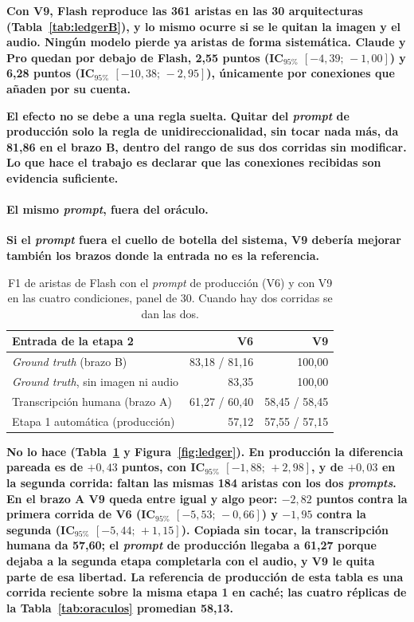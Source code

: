 \documentclass[a4paper, twocolumn, 10pt]{IEEEtran}
\newcommand{\nuevo}[1]{{\bfseries #1}}
\begin{document}
\nuevo{Con V9, Flash reproduce las 361 aristas en las 30 arquitecturas
(Tabla~\ref{tab:ledgerB}), y lo mismo ocurre si se le quitan la imagen y el audio.
Ningún modelo pierde ya aristas de forma sistemática. Claude y Pro quedan por debajo
de Flash, 2,55 puntos (IC$_{95\%}$ $[-4{,}39;\,-1{,}00]$) y 6,28 puntos (IC$_{95\%}$
$[-10{,}38;\,-2{,}95]$), únicamente por conexiones que añaden por su cuenta.}

\nuevo{El efecto no se debe a una regla suelta. Quitar del \emph{prompt} de
producción solo la regla de unidireccionalidad, sin tocar nada más, da 81,86 en el
brazo B, dentro del rango de sus dos corridas sin modificar. Lo que hace el trabajo
es declarar que las conexiones recibidas son evidencia suficiente.}

\paragraph{\nuevo{El mismo \emph{prompt}, fuera del oráculo.}} \nuevo{Si el \emph{prompt}
fuera el cuello de botella del sistema, V9 debería mejorar también los brazos donde
la entrada no es la referencia.}

\begin{table}[H]
\centering\footnotesize\setlength{\tabcolsep}{3pt}\bfseries
\caption{F1 de aristas de Flash con el \emph{prompt} de producción (V6) y con V9 en
las cuatro condiciones, panel de 30. Cuando hay dos corridas se dan las dos.}
\label{tab:ledger4}
\begin{tabular}{lrr}
\toprule
Entrada de la etapa 2 & V6 & V9\\
\midrule
\emph{Ground truth} (brazo B)                 & 83,18 / 81,16 & 100,00\\
\emph{Ground truth}, sin imagen ni audio      & 83,35         & 100,00\\
Transcripción humana (brazo A)                & 61,27 / 60,40 & 58,45 / 58,45\\
Etapa 1 automática (producción)               & 57,12         & 57,55 / 57,15\\
\bottomrule
\end{tabular}
\end{table}

\nuevo{No lo hace (Tabla~\ref{tab:ledger4} y Figura~\ref{fig:ledger}). En producción
la diferencia pareada es de $+0{,}43$ puntos, con IC$_{95\%}$ $[-1{,}88;\,+2{,}98]$, y
de $+0{,}03$ en la segunda corrida: faltan las mismas 184 aristas con los dos
\emph{prompts}. En el brazo A V9 queda entre igual y algo peor: $-2{,}82$ puntos
contra la primera corrida de V6 (IC$_{95\%}$ $[-5{,}53;\,-0{,}66]$) y $-1{,}95$ contra
la segunda (IC$_{95\%}$ $[-5{,}44;\,+1{,}15]$). Copiada sin tocar, la transcripción
humana da 57,60; el \emph{prompt} de producción llegaba a 61,27 porque dejaba a la
segunda etapa completarla con el audio, y V9 le quita parte de esa libertad. La
referencia de producción de esta tabla es una corrida reciente sobre la misma etapa 1
en caché; las cuatro réplicas de la Tabla~\ref{tab:oraculos} promedian 58,13.}
\end{document}

